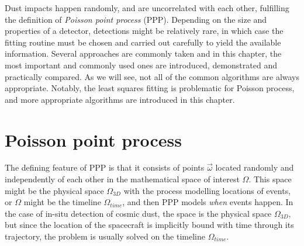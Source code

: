 Dust impacts happen randomly, and are uncorrelated with each other, fulfilling the definition of \textit{Poisson point process} (PPP). Depending on the size and properties of a detector, detections might be relatively rare, in which case the fitting routine must be chosen and carried out carefully to yield the available information. Several approaches are commonly taken and in this chapter, the most important and commonly used ones are introduced, demonstrated and practically compared. As we will see, not all of the common algorithms are always appropriate. Notably, the least squares fitting is problematic for Poisson process, and more appropriate algorithms are introduced in this chapter.

\section{Poisson point process}

The defining feature of PPP is that it consists of points $\vec{\omega}$ located randomly and independently of each other in the mathematical space of interest $\Omega$. This space might be the physical space $\Omega_{3D}$ with the process modelling locations of events, or $\Omega$ might be the timeline $\Omega_{time}$, and then PPP models \textit{when} events happen. In the case of in-situ detection of cosmic dust, the space is the physical space $\Omega_{3D}$, but since the location of the spacecraft is implicitly bound with time through its trajectory, the problem is usually solved on the timeline $\Omega_{time}$.


